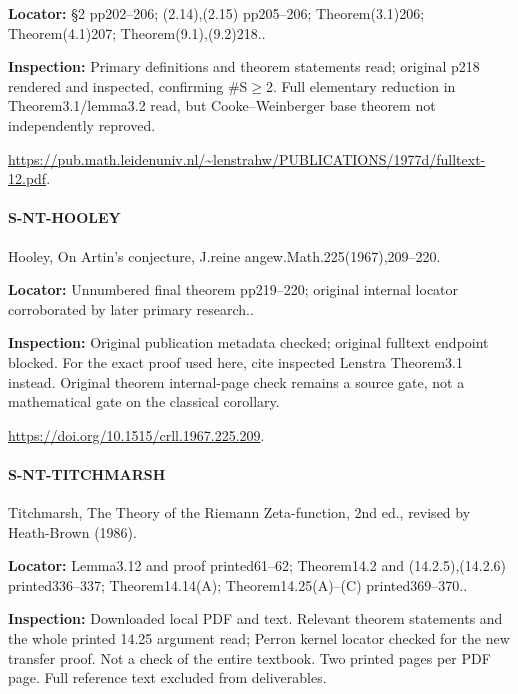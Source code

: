 \documentclass[11pt,a4paper]{article}
\begin{document}
\textbf{Locator:} §2 pp202–\allowbreak{}206; (2.\allowbreak{}14),(2.\allowbreak{}15) pp205–\allowbreak{}206; Theorem(3.\allowbreak{}1)206; Theorem(4.\allowbreak{}1)207; Theorem(9.\allowbreak{}1),(9.\allowbreak{}2)218.\allowbreak{}.

\textbf{Inspection:} Primary definitions and theorem statements read; original p218 rendered and inspected, confirming \#S\ensuremath{\ge}2.\allowbreak{} Full elementary reduction in Theorem3.\allowbreak{}1/\allowbreak{}lemma3.\allowbreak{}2 read, but Cooke–\allowbreak{}Weinberger base theorem not independently reproved.\allowbreak{}

\url{https://pub.math.leidenuniv.nl/~lenstrahw/PUBLICATIONS/1977d/fulltext-12.pdf}.

\paragraph{S-NT-HOOLEY} Hooley, On Artin’s conjecture, J.\allowbreak{}reine angew.\allowbreak{}Math.\allowbreak{}225(1967),209–\allowbreak{}220.

\textbf{Locator:} Unnumbered final theorem pp219–\allowbreak{}220; original internal locator corroborated by later primary research.\allowbreak{}.

\textbf{Inspection:} Original publication metadata checked; original fulltext endpoint blocked.\allowbreak{} For the exact proof used here, cite inspected Lenstra Theorem3.\allowbreak{}1 instead.\allowbreak{} Original theorem internal-page check remains a source gate, not a mathematical gate on the classical corollary.\allowbreak{}

\url{https://doi.org/10.1515/crll.1967.225.209}.

\paragraph{S-NT-TITCHMARSH} Titchmarsh, The Theory of the Riemann Zeta-function, 2nd ed.\allowbreak{}, revised by Heath-Brown (1986).

\textbf{Locator:} Lemma3.\allowbreak{}12 and proof printed61–\allowbreak{}62; Theorem14.\allowbreak{}2 and (14.\allowbreak{}2.\allowbreak{}5),(14.\allowbreak{}2.\allowbreak{}6) printed336–\allowbreak{}337; Theorem14.\allowbreak{}14(A); Theorem14.\allowbreak{}25(A)–\allowbreak{}(C) printed369–\allowbreak{}370.\allowbreak{}.

\textbf{Inspection:} Downloaded local PDF and text.\allowbreak{} Relevant theorem statements and the whole printed 14.\allowbreak{}25 argument read; Perron kernel locator checked for the new transfer proof.\allowbreak{} Not a check of the entire textbook.\allowbreak{} Two printed pages per PDF page.\allowbreak{} Full reference text excluded from deliverables.\allowbreak{}
\end{document}
